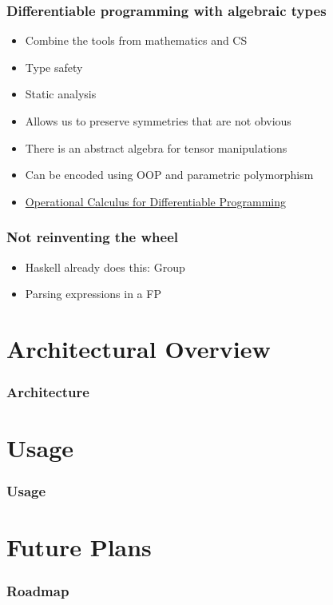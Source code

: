 \documentclass{beamer}
\begin{document}
    \begin{frame}
        \frametitle{Differentiable programming with algebraic types}
        \begin{itemize}
            \item Combine the tools from mathematics and CS
            \item Type safety
            \item Static analysis
            \item Allows us to preserve symmetries that are not obvious
            \item There is an abstract algebra for tensor manipulations
            \item Can be encoded using OOP and parametric polymorphism
            \item \href{https://arxiv.org/pdf/1610.07690.pdf}{Operational Calculus for Differentiable Programming}
        \end{itemize}
    \end{frame}



    \begin{frame}
        \frametitle{Not reinventing the wheel}
        \begin{itemize}
            \item Haskell already does this: Group
            \item Parsing expressions in a FP
        \end{itemize}
    \end{frame}


    \section{Architectural Overview}\label{sec:second-section}

    \begin{frame}
        \frametitle{Architecture}
    \end{frame}

    \section{Usage}\label{sec:third-section}

    \begin{frame}
        \frametitle{Usage}
    \end{frame}

    \section{Future Plans}\label{sec:fourth-section}

    \begin{frame}
        \frametitle{Roadmap}
    \end{frame}
\end{document}
